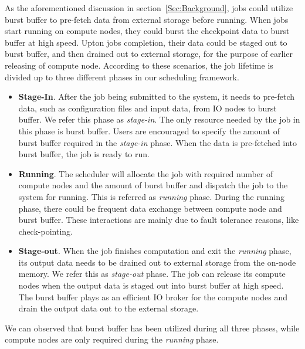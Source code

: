As the aforementioned discussion in section~\ref{Sec:Background}, jobs could utilize burst buffer to pre-fetch data from external storage before running. When jobs start running on compute nodes, they could burst the checkpoint data to burst buffer at high speed. Upton jobs completion, their data could be staged out to burst buffer, and then drained out to external storage, for the purpose of earlier releasing of compute node. According to these scenarios, the job lifetime is divided up to three different phases in our scheduling framework.

\begin{itemize}
 \item \textbf{Stage-In}. After the job being submitted to the system, it needs to pre-fetch data, such as configuration files and input data, from IO nodes to burst buffer. We refer this phase as \textit{stage-in}. The only resource needed by the job in this phase is burst buffer. Users are encouraged to specify the amount of burst buffer required in the \textit{stage-in} phase. When the data is pre-fetched into burst buffer, the job is ready to run.
 
 \item \textbf{Running}. The scheduler will allocate the job with required number of compute nodes and the amount of burst buffer and dispatch the job to the system for running. This is referred as \textit{running} phase. During the running phase, there could be frequent data exchange between compute node and burst buffer. These interactions are mainly due to fault tolerance reasons, like check-pointing. 
 
 \item \textbf{Stage-out}. When the job finishes computation and exit the \textit{running} phase, its output data needs to be drained out to external storage from the on-node memory. We refer this as \textit{stage-out} phase. The job can release its compute nodes when the output data is staged out into burst buffer at high speed. The burst buffer plays as an efficient IO broker for the compute nodes and drain the output data out to the external storage.
 
\end{itemize}

We can observed that burst buffer has been utilized during all three phases, while compute nodes are only required during the \textit{running} phase. 


